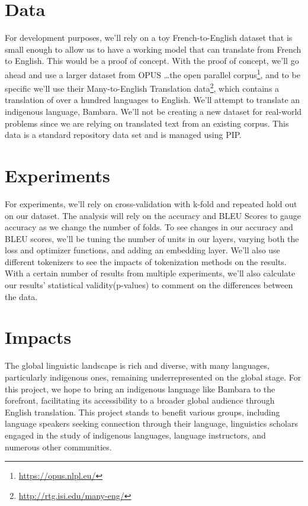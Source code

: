 \documentclass{article}
\begin{document}
\section{Data}


For development purposes, we’ll rely on a toy French-to-English dataset that is 
small enough to allow us to have a working model that can translate from French to 
English. This would be a proof of concept.  With the proof of concept, we’ll go 
ahead and use a larger dataset from OPUS \dots the open parallel corpus\footnote{ 
\url{https://opus.nlpl.eu/}}, and to be specific we’ll use their Many-to-English 
Translation data\footnote{ \url{http://rtg.isi.edu/many-eng/}}, which contains a 
translation of over a hundred languages to English. We’ll attempt to translate an 
indigenous language, Bambara.  We’ll not be creating a new dataset for real-world 
problems since we are relying on translated text from an existing corpus. This data
is a standard repository data set and is managed using PIP. 
\section{Experiments} 

For experiments, we’ll rely on cross-validation with k-fold and repeated hold out on 
our dataset. The analysis will rely on the accuracy and BLEU\cite{Bleu} Scores to gauge accuracy as we change the number of folds.  To see changes in our accuracy and BLEU scores, we’ll be tuning the number of units in our layers, varying both the loss and 
optimizer functions, and adding an embedding layer. We’ll also use different 
tokenizers to see the impacts of tokenization methods on the results. With a certain
number of results from multiple experiments, we’ll also calculate our results' 
statistical validity(p-values) to comment on the differences between the data.
\section{Impacts}

The global linguistic landscape is rich and diverse, with many languages, 
particularly indigenous ones, remaining underrepresented on the global stage. For
this project, we hope to bring an indigenous language like Bambara to the forefront, 
facilitating its accessibility to a broader global audience through English 
translation. This project stands to benefit various groups, including language 
speakers seeking connection through their language, linguistics scholars engaged in 
the study of indigenous languages, language instructors, and numerous other 
communities.
\end{document}
